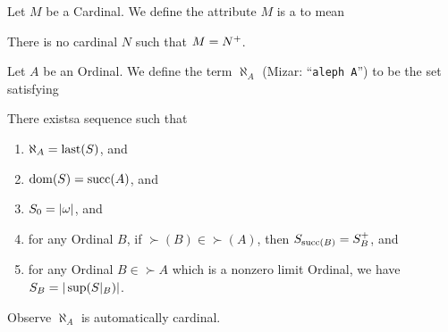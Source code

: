 \documentclass{article}
\begin{document}
\begin{definition}
Let $M$ be a Cardinal. We define the attribute $M$ is a 
to mean
\begin{defn}
\item There is no cardinal $N$ such that $M=N^{+}$.
\end{defn}
\end{definition}

\begin{definition}
Let $A$ be an Ordinal. We define the term $\aleph_{A}$ (Mizar:
``\verb#aleph A#'') to be the set satisfying
\begin{defn}
\item There existsa sequence such that
  \begin{enumerate}[label=(\roman*)]
  \item $\aleph_{A}=\operatorname{last}(S)$, and
  \item $\operatorname{dom}(S)=\operatorname{succ}(A)$, and
  \item $S_{0}=|\omega|$, and
  \item for any Ordinal $B$, if $\succ(B)\in\succ(A)$, then
    $S_{\operatorname{succ}(B)}=S_{B}^{+}$,
    and
  \item for any Ordinal $B\in\succ A$ which is a nonzero limit Ordinal,
    we have $S_{B}=|\sup(S|_{B})|$.
  \end{enumerate}
\end{defn}
\end{definition}

Observe $\aleph_{A}$ is automatically cardinal.
\end{document}

